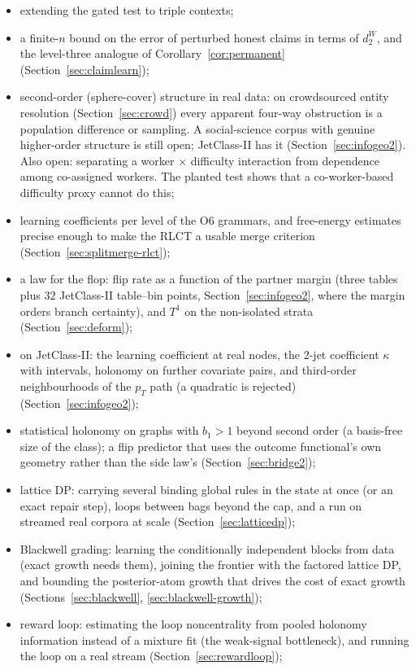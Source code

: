 \documentclass[11pt]{article}
\theoremstyle{definition}
\theoremstyle{remark}
\begin{document}
\begin{itemize}
\begin{itemize}
    \item extending the gated test to triple contexts;
    \item a finite-$n$ bound on the error of perturbed honest claims in terms of $d_2^W$, and the level-three analogue of Corollary~\ref{cor:permanent} (Section~\ref{sec:claimlearn});
    \item second-order (sphere-cover) structure in real data: on crowdsourced entity resolution (Section~\ref{sec:crowd}) every apparent four-way obstruction is a population difference or sampling. A social-science corpus with genuine higher-order structure is still open; JetClass-II has it (Section~\ref{sec:infogeo2}). Also open: separating a worker $\times$ difficulty interaction from dependence among co-assigned workers. The planted test shows that a co-worker-based difficulty proxy cannot do this;
    \item learning coefficients per level of the O6 grammars, and free-energy estimates precise enough to make the RLCT a usable merge criterion (Section~\ref{sec:splitmerge-rlct});
    \item a law for the flop: flip rate as a function of the partner margin (three tables plus $32$ JetClass-II table--bin points, Section~\ref{sec:infogeo2}, where the margin orders branch certainty), and $T^1$ on the non-isolated strata (Section~\ref{sec:deform});
    \item on JetClass-II: the learning coefficient at real nodes, the 2-jet coefficient $\kappa$ with intervals, holonomy on further covariate pairs, and third-order neighbourhoods of the $p_T$ path (a quadratic is rejected) (Section~\ref{sec:infogeo2});
    \item statistical holonomy on graphs with $b_1>1$ beyond second order (a basis-free size of the class); a flip predictor that uses the outcome functional's own geometry rather than the side law's (Section~\ref{sec:bridge2});
    \item lattice DP: carrying several binding global rules in the state at once (or an exact repair step), loops between bags beyond the cap, and a run on streamed real corpora at scale (Section~\ref{sec:latticedp});
    \item Blackwell grading: learning the conditionally independent blocks from data (exact growth needs them), joining the frontier with the factored lattice DP, and bounding the posterior-atom growth that drives the cost of exact growth (Sections~\ref{sec:blackwell}, \ref{sec:blackwell-growth});
    \item reward loop: estimating the loop noncentrality from pooled holonomy information instead of a mixture fit (the weak-signal bottleneck), and running the loop on a real stream (Section~\ref{sec:rewardloop});

\end{itemize}
\end{itemize}
\end{document}
